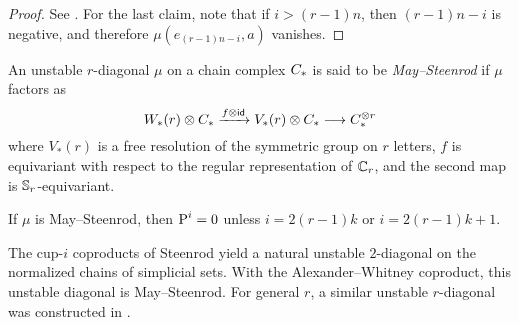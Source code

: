 \begin{proof}
	See \cite{may1970general}.
	For the last claim, note that if $i>(r-1)n$, then $(r-1)n-i$ is negative, and therefore $\mu(e_{(r-1)n-i},a)$ vanishes.
\end{proof}

\begin{definition}
	An unstable $r$-diagonal $\mu$ on a chain complex $C_{*}$ is said to be \emph{May--Steenrod} if $\mu$ factors as
	\[
	W_{*}(r) \otimes C_{*} \xrightarrow{f \otimes \mathsf{id}} V_*(r) \otimes C_{*} \longrightarrow C_{*}^{\otimes r}
	\]
	where $V_*(r)$ is a free resolution of the symmetric group on $r$ letters, $f$ is equivariant with respect to the regular representation of $\mathbb{C}_r$, and the second map is $\mathbb{S}_r$-equivariant.
\end{definition}

\begin{remark}
	If $\mu$ is May--Steenrod, then $\operatorname{P}^i = 0$ unless $i = 2(r-1)k$ or $i = 2(r-1)k+1$.
\end{remark}

\begin{example}
	The cup-$i$ coproducts of Steenrod \cite{steenrod1947products, medina2022axiomatic} yield a natural unstable $2$-diagonal on the normalized chains of simplicial sets.
	With the Alexander--Whitney coproduct, this unstable diagonal is May--Steenrod.
	For general $r$, a similar unstable $r$-diagonal was constructed in \cite{medina2021may_st}.
\end{example}

